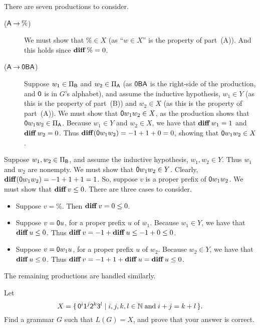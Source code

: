 There are seven productions to consider.
\begin{description}
\item[\quad($\mathsf{A}\mathbin{\to}\%$)] We must show that $\%\in X$ (as
  ``$w\in X$'' is the property of part~(A)).  And this holds since
  $\mathbf{diff}\,\% = 0$.

\item[\quad($\mathsf{A}\mathbin{\to}\mathsf{0}\mathsf{B}\mathsf{A}$)] Suppose $w_1\in\Pi_{\mathsf{B}}$ and
  $w_2\in\Pi_{\mathsf{A}}$ (as $\mathsf{0}\mathsf{B}\mathsf{A}$ is the right-side of the
  production, and $\mathsf{0}$ is in $G$'s alphabet),
  and assume the inductive hypothesis,
  $w_1\in Y$ (as this is the property of part~(B)) and
  $w_2\in X$ (as this is the property of part~(A)).  We
  must show that $\mathsf{0} w_1w_2\in X$, as the production
  shows that $\mathsf{0} w_1w_2\in\Pi_{\mathsf{A}}$.  Because
  $w_1\in Y$ and $w_2\in X$, we have that $\mathbf{diff}\,w_1=1$ and
  $\mathbf{diff}\,w_2=0$.  Thus $\mathbf{diff}(\mathsf{0} w_1w_2) = -1 + 1 + 0 = 0$, showing
  that $\mathsf{0} w_1w_2\in X$.
\end{description}

\begin{description}
\item[\quad($\Bsf\fun\zerosf\Bsf\Bsf$)] Suppose $w_1,w_2\in\Pi_{\mathsf{B}}$,
  and assume the inductive hypothesis, $w_1,w_2\in Y$.  Thus $w_1$ and
  $w_2$ are nonempty. We must show
  that $\mathsf{0} w_1w_2\in Y$.  Clearly, $\mathbf{diff}(\mathsf{0} w_1w_2) =
  -1 + 1 + 1 = 1$.  So, suppose $v$ is a proper prefix of
  $\mathsf{0} w_1w_2$.  We must show that $\mathbf{diff}\,v\leq 0$.
  There are three cases to consider.
  \begin{itemize}
  \item Suppose $v = \%$.  Then $\mathbf{diff}\,v = 0\leq 0$.

  \item Suppose $v=\mathsf{0} u$, for a proper prefix $u$ of $w_1$.
    Because $w_1\in Y$, we have that $\mathbf{diff}\,u\leq 0$.  Thus
    $\mathbf{diff}\,v = -1 + \mathbf{diff}\,u \leq -1 + 0\leq 0$.

  \item Suppose $v=\mathsf{0} w_1u$, for a proper prefix $u$ of $w_2$.
    Because $w_2\in Y$, we have that $\mathbf{diff}\,u\leq 0$.
    Thus $\mathbf{diff}\,v = -1 + 1 + \mathbf{diff}\,u = \mathbf{diff}\,u\leq 0$.
  \end{itemize}

\item The remaining productions are handled similarly.
\end{description}

\begin{exercise}
Let
\begin{displaymath}
  X = \{ \, \mathsf{0}^i\mathsf{1}^j\mathsf{2}^k\mathsf{3}^l \mid i,j,k,l\in\mathbb{N}\;\allowbreak\mbox{and}\allowbreak\;
    i + j = k + l \, \} .
\end{displaymath}
Find a grammar $G$ such that $L(G) = X$, and prove that your answer is
correct.
\end{exercise}

